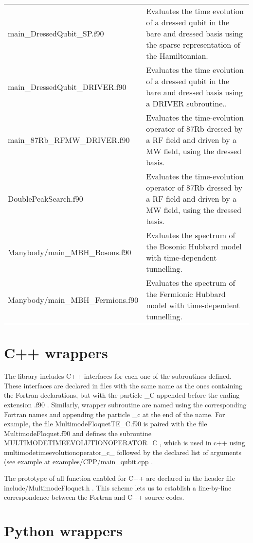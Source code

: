 \documentclass[10pt,a4paper]{article}
\begin{document}
\begin{tabular}{p{5.5cm}p{9.5cm}}
main\_DressedQubit\_SP.f90 & Evaluates the time evolution of a dressed qubit in the bare and dressed basis using the sparse representation of the Hamiltonnian. \\
main\_DressedQubit\_DRIVER.f90  & Evaluates the time evolution of a dressed qubit in the bare and dressed basis using a DRIVER subroutine.. \\
main\_87Rb\_RFMW\_DRIVER.f90 & Evaluates the time-evolution operator of 87Rb dressed by a RF field and driven by a MW field, using the dressed basis. \\
DoublePeakSearch.f90   &  Evaluates the time-evolution operator of 87Rb dressed by a RF field and driven by a MW field, using the dressed basis. \\
Manybody/main\_MBH\_Bosons.f90 & Evaluates the spectrum of the Bosonic Hubbard model with time-dependent tunnelling.\\
Manybody/main\_MBH\_Fermions.f90 & Evaluates the spectrum of the Fermionic Hubbard model with time-dependent tunnelling.\\
\end{tabular}
\section{C++ wrappers}

The library includes  C++ interfaces for each one of the subroutines defined. These interfaces are declared in files with the same name as the ones containing the Fortran declarations, but with the particle   \_C  appended before the ending extension   .f90 .  Similarly,  wrapper subroutine are named using the corresponding Fortran names and appending the particle   \_c  at the end of the name. For example, the file   MultimodeFloquetTE\_C.f90   is paired with the file   MultimodeFloquet.f90  and defines the subroutine   MULTIMODETIMEEVOLUTIONOPERATOR\_C , which is used in   c++   using   multimodetimeevolutionoperator\_c\_  followed by the declared list of arguments (see example at   examples/CPP/main\_qubit.cpp .

The prototype of all function enabled for C++ are declared in the header file   include/MultimodeFloquet.h . This scheme lets us to establish a line-by-line  correspondence between the Fortran and C++ source codes.


\section{Python wrappers}
\end{document}
